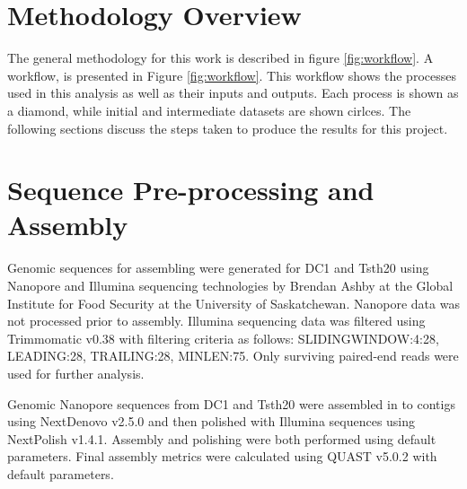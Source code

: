 \section{Methodology Overview}

The general methodology for this work is described in figure
\ref{fig:workflow}. A workflow, is presented in Figure
\ref{fig:workflow}. This workflow shows the processes used in this
analysis as well as their inputs and outputs. Each process is shown as
a diamond, while initial and intermediate datasets are shown
cirlces. The following sections discuss the steps taken to produce the
results for this project.



\section{Sequence Pre-processing and Assembly}


Genomic sequences for assembling were generated for DC1 and Tsth20
using Nanopore\cite{Wang2021} and Illumina\cite{Bennett2004}
sequencing technologies by Brendan Ashby at the Global Institute for
Food Security at the University of Saskatchewan. Nanopore data was not
processed prior to assembly. Illumina sequencing data was filtered
using Trimmomatic v0.38\cite{Bolger2014} with filtering criteria as
follows: SLIDINGWINDOW:4:28, LEADING:28, TRAILING:28, MINLEN:75. Only
surviving paired-end reads were used for further analysis.

Genomic Nanopore sequences from DC1 and Tsth20 were assembled in to
contigs using NextDenovo\cite{Hu2024} v2.5.0 and then polished with
Illumina sequences using NextPolish\cite{Hu2020} v1.4.1. Assembly and
polishing were both performed using default parameters. Final assembly
metrics were calculated using QUAST v5.0.2\cite{Gurevich2013} with
default parameters.

